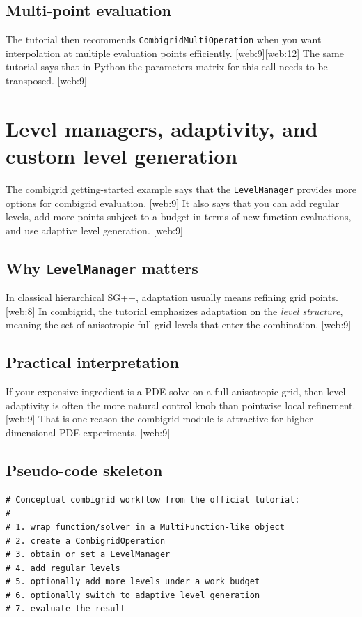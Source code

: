 \documentclass[11pt,a4paper]{article}
\begin{document}
\subsection{Multi-point evaluation}
The tutorial then recommends \texttt{CombigridMultiOperation} when you want interpolation at multiple evaluation points efficiently. [web:9][web:12]  
The same tutorial says that in Python the parameters matrix for this call needs to be transposed. [web:9]  

\section{Level managers, adaptivity, and custom level generation}

The combigrid getting-started example says that the \texttt{LevelManager} provides more options for combigrid evaluation. [web:9]  
It also says that you can add regular levels, add more points subject to a budget in terms of new function evaluations, and use adaptive level generation. [web:9]  

\subsection{Why \texttt{LevelManager} matters}
In classical hierarchical SG++, adaptation usually means refining grid points. [web:8]  
In combigrid, the tutorial emphasizes adaptation on the \emph{level structure}, meaning the set of anisotropic full-grid levels that enter the combination. [web:9]  

\subsection{Practical interpretation}
If your expensive ingredient is a PDE solve on a full anisotropic grid, then level adaptivity is often the more natural control knob than pointwise local refinement. [web:9]  
That is one reason the combigrid module is attractive for higher-dimensional PDE experiments. [web:9]  

\subsection{Pseudo-code skeleton}
\begin{lstlisting}[style=py]
# Conceptual combigrid workflow from the official tutorial:
#
# 1. wrap function/solver in a MultiFunction-like object
# 2. create a CombigridOperation
# 3. obtain or set a LevelManager
# 4. add regular levels
# 5. optionally add more levels under a work budget
# 6. optionally switch to adaptive level generation
# 7. evaluate the result
\end{lstlisting}
\end{document}
